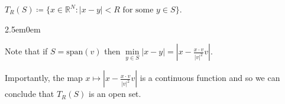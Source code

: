 \documentclass{book}
\newcommand{\hTwo}{%
\color{Black}%
   \fontsize{13}{15}\selectfont%
}
\newcommand{\pracTwo}{
   \color{Orange}%
   \fontsize{12}{14}\selectfont%
}
\newenvironment{myIndent}{%
   \begin{adjustwidth}{2.5em}{0em}%
}{%
   \end{adjustwidth}%
}
\newcommand{\pprime}{{\prime\prime}}
\newcommand{\mSpan}{\mathrm{span}}
\newcommand{\retTwo}{\hfill\bigbreak}
\begin{document}
{\centering$T_R(S) \coloneqq \{x \in \mathbb{R}^N : |x - y| < R \text{ for some } y \in S\}$.\retTwo\par}

\begin{myIndent}\pracTwo
	Note that if $S = \mSpan(v)$ then $\min\limits_{y \in S} |x - y| = \left|x - \frac{x\cdot v}{|v|^2}v\right|$.\retTwo
	
	Importantly, the map $x \mapsto \left|x - \frac{x\cdot v}{|v|^2}v\right|$ is a continuous function and so we can conclude that $T_R(S)$ is an open set.\newpage
\end{myIndent}

















	

\end{document}
